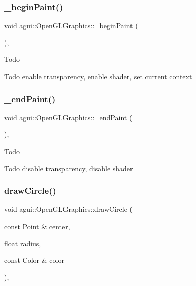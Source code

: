 \subsubsection{\texorpdfstring{\+\_\+begin\+Paint()}{\_beginPaint()}}
{\footnotesize\ttfamily void agui\+::\+Open\+G\+L\+Graphics\+::\+\_\+begin\+Paint (\begin{DoxyParamCaption}{ }\end{DoxyParamCaption})\hspace{0.3cm}{\ttfamily [override]}, {\ttfamily [virtual]}}

\begin{DoxyRefDesc}{Todo}
\item[\mbox{\hyperlink{todo__todo000005}{Todo}}]enable transparency, enable shader, set current context \end{DoxyRefDesc}
\mbox{\label{classagui_1_1_open_g_l_graphics_a744c073f057d938eec458a2517f5822a}} 
\subsubsection{\texorpdfstring{\+\_\+end\+Paint()}{\_endPaint()}}
{\footnotesize\ttfamily void agui\+::\+Open\+G\+L\+Graphics\+::\+\_\+end\+Paint (\begin{DoxyParamCaption}{ }\end{DoxyParamCaption})\hspace{0.3cm}{\ttfamily [override]}, {\ttfamily [virtual]}}

\begin{DoxyRefDesc}{Todo}
\item[\mbox{\hyperlink{todo__todo000006}{Todo}}]disable transparency, disable shader \end{DoxyRefDesc}
\mbox{\label{classagui_1_1_open_g_l_graphics_ade9a5b35baddea11cb56e40676572c45}} 
\subsubsection{\texorpdfstring{draw\+Circle()}{drawCircle()}}
{\footnotesize\ttfamily void agui\+::\+Open\+G\+L\+Graphics\+::draw\+Circle (\begin{DoxyParamCaption}\item[{const Point \&}]{center,  }\item[{float}]{radius,  }\item[{const Color \&}]{color }\end{DoxyParamCaption})\hspace{0.3cm}{\ttfamily [override]}, {\ttfamily [virtual]}}

